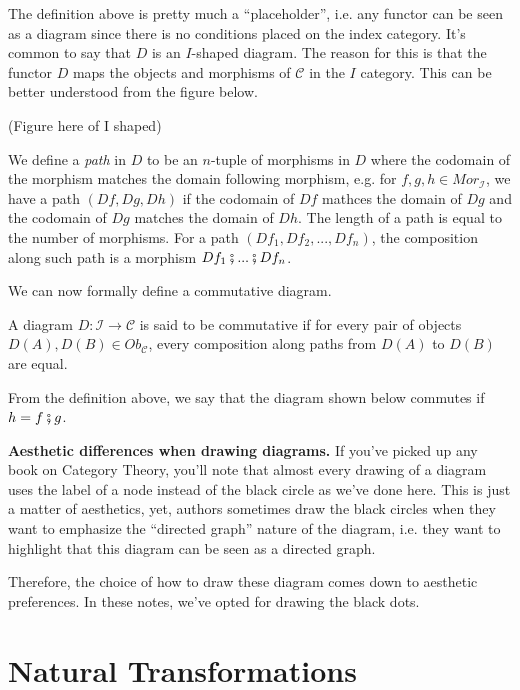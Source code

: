 The definition above is pretty much a ``placeholder'', i.e. any functor can be seen as
a diagram since there is no conditions placed on the index category. It's common to
say that $D$ is an $I$-shaped diagram. The reason for this is that the functor
$D$ maps the objects and morphisms of $\mathcal C$ in the $I$ category. This
can be better understood from the figure below.

(Figure here of I shaped)

We define a \textit{path} in $D$ to be an $n$-tuple of morphisms in $D$ where
the codomain of the morphism matches the domain following morphism, e.g.
for $f,g,h \in Mor_\mathcal I$, we have a path $(Df, Dg, Dh)$ if
the codomain of $Df$ mathces the domain of $Dg$ and the codomain of $Dg$ matches
the domain of $Dh$.
The length of a path is equal to the number of morphisms. For a path
$(Df_1, Df_2,...,Df_n)$, the composition along such path is a morphism $Df_1\fatsemi ...\fatsemi Df_n$.

We can now formally define a commutative diagram.

\begin{definition}
	A diagram $D:\mathcal I \to \mathcal C$ is said to be commutative if
	for every pair of objects $D(A), D(B) \in Ob_\mathcal C$,
	every composition along paths from $D(A)$ to $D(B)$ are equal.
\end{definition}

From the definition above, we say that the diagram shown below commutes
if $h = f \fatsemi g$.

\begin{shaded}
	\textbf{Aesthetic differences when drawing diagrams.}
	If you've picked up any book on Category Theory, you'll note that almost every
	drawing of a diagram uses the label of a node instead of the black circle
	as we've done here. This is just a matter of aesthetics, yet, authors
	sometimes draw the black circles when they want to emphasize the
	``directed graph'' nature of the diagram, i.e. they want to highlight
	that this diagram can be seen as a directed graph.

	Therefore, the choice of how to draw these diagram comes down to
	aesthetic preferences. In these notes, we've opted for drawing the
	black dots.
\end{shaded}


\section{Natural Transformations}

